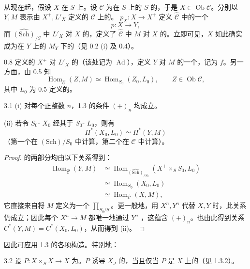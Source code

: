 从现在起，假设 $X$ 在 $S$ 上。设 $\mathcal C$ 为在 $S$ 上的 $S$-的，于是 $X\in\operatorname{Ob}\mathcal C$。分别以 $Y,M$ 表示由 $X^+,L'_X$ 定义的 $\mathcal C$ 上的。 $p_X:X\to X^+$ 定义 $\widehat{\mathcal C}$ 中的一个
\[
 p:X\longrightarrow Y,
\]
而 $\widehat{(\mathrm{Sch})}_{/S}$ 中 $L'_X$ 对 $X$ 的，定义了 $\widehat{\mathcal C}$ 中 $M$ 对 $X$ 的。立即可见，$X$ 如此确实成为在 $Y$ 上的 $M_Y$ 下的（见 0.2 (i) 及 0.4）。

0.8 定义的 $X^+$ 对 $L'_X$ 的（该处记为 $\operatorname{Ad}$），定义 $Y$ 对 $M$ 的一个，记为 $f$。另一方面，由 0.5 知
\[
 \operatorname{Hom}_{\widehat{\mathcal C}}(Z,M)
 \simeq\operatorname{Hom}_{S_0}(Z_0,L_0),\qquad Z\in\operatorname{Ob}\mathcal C,
\]
其中 $L_0$ 为 0.5 定义的。
\begin{SGAresult}{}{3.1}
(i) 对每个正整数 $n$，1.3 的条件 $(+)_n$ 均成立。

(ii) 若令 $S_0$- $X_0$ 经其于 $S_0$- $L_0$，则有
\[
 H^*(X_0,L_0)\simeq H^*(Y,M)
\]
（第一个在 $(\mathrm{Sch})/S_0$ 中计算，第二个在 $\mathcal C$ 中计算）。
\end{SGAresult}
\begin{proof}
的两部分均由以下关系得到：
\[
\begin{aligned}
 \operatorname{Hom}_{\widehat{\mathcal C}}(Y,M)
 &\simeq\operatorname{Hom}_{\widehat{(\mathrm{Sch})}_{/S_0}}(X^+\times_S S_0,L_0)\\
 &\simeq\operatorname{Hom}_{S_0}(X_0,L_0)\\
 &\simeq\operatorname{Hom}_{\widehat{\mathcal C}}(X,M),
\end{aligned}
\]
它直接来自将 $M$ 定义为一个 $\prod_{S_0/S}$。更一般地，用 $X^n,Y^n$ 代替 $X,Y$ 时，此关系仍成立；因此每个 $X^n\to M$ 都唯一地通过 $Y^n$ ，这蕴含 $(+)_n$。也由此得到关系 $C^*(Y,M)=C^*(X_0,L_0)$，从而得到 (ii)。
\end{proof}
因此可应用 1.3 的各项构造。特别地：
\begin{SGAresult}{}{3.2}
设 $P:X\times_S X\to X$ 为。$P$ 诱导 $X_J$ 的，当且仅当 $P$ 是 $X$ 上的（见 1.3.2）。
\end{SGAresult}

